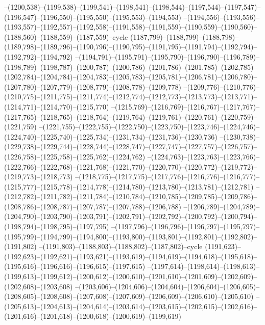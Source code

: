 --(1200,538)--(1199,538)--(1199,541)--(1198,541)--(1198,544)--(1197,544)--(1197,547)--(1196,547)--(1196,550)--(1195,550)--(1195,553)--(1194,553)
--(1194,556)--(1193,556)--(1193,557)--(1192,557)--(1192,558)--(1191,558)--(1191,559)--(1190,559)--(1190,560)--(1188,560)--(1188,559)--(1187,559)--cycle
(1187,799)--(1188,799)--(1188,798)--(1189,798)--(1189,796)--(1190,796)--(1190,795)--(1191,795)--(1191,794)--(1192,794)--(1192,792)--(1194,792)
--(1194,791)--(1195,791)--(1195,790)--(1196,790)--(1196,789)--(1198,789)--(1198,787)--(1200,787)--(1200,786)--(1201,786)--(1201,785)--(1202,785)
--(1202,784)--(1204,784)--(1204,783)--(1205,783)--(1205,781)--(1206,781)--(1206,780)--(1207,780)--(1207,779)--(1208,779)--(1208,778)--(1209,778)
--(1209,776)--(1210,776)--(1210,775)--(1211,775)--(1211,774)--(1212,774)--(1212,773)--(1213,773)--(1213,771)--(1214,771)--(1214,770)--(1215,770)
--(1215,769)--(1216,769)--(1216,767)--(1217,767)--(1217,765)--(1218,765)--(1218,764)--(1219,764)--(1219,761)--(1220,761)--(1220,759)--(1221,759)
--(1221,755)--(1222,755)--(1222,750)--(1223,750)--(1223,746)--(1224,746)--(1224,740)--(1225,740)--(1225,734)--(1231,734)--(1231,736)--(1230,736)
--(1230,738)--(1229,738)--(1229,744)--(1228,744)--(1228,747)--(1227,747)--(1227,757)--(1226,757)--(1226,758)--(1225,758)--(1225,762)--(1224,762)
--(1224,763)--(1223,763)--(1223,766)--(1222,766)--(1222,768)--(1221,768)--(1221,770)--(1220,770)--(1220,772)--(1219,772)--(1219,773)--(1218,773)
--(1218,775)--(1217,775)--(1217,776)--(1216,776)--(1216,777)--(1215,777)--(1215,778)--(1214,778)--(1214,780)--(1213,780)--(1213,781)--(1212,781)
--(1212,782)--(1211,782)--(1211,784)--(1210,784)--(1210,785)--(1209,785)--(1209,786)--(1208,786)--(1208,787)--(1207,787)--(1207,788)--(1206,788)
--(1206,789)--(1204,789)--(1204,790)--(1203,790)--(1203,791)--(1202,791)--(1202,792)--(1200,792)--(1200,794)--(1198,794)--(1198,795)--(1197,795)
--(1197,796)--(1196,796)--(1196,797)--(1195,797)--(1195,799)--(1194,799)--(1194,800)--(1193,800)--(1193,801)--(1192,801)--(1192,802)--(1191,802)
--(1191,803)--(1188,803)--(1188,802)--(1187,802)--cycle
(1191,623)--(1192,623)--(1192,621)--(1193,621)--(1193,619)--(1194,619)--(1194,618)--(1195,618)--(1195,616)--(1196,616)--(1196,615)--(1197,615)
--(1197,614)--(1198,614)--(1198,613)--(1199,613)--(1199,612)--(1200,612)--(1200,610)--(1201,610)--(1201,609)--(1202,609)--(1202,608)--(1203,608)
--(1203,606)--(1204,606)--(1204,604)--(1206,604)--(1206,605)--(1208,605)--(1208,608)--(1207,608)--(1207,609)--(1206,609)--(1206,610)--(1205,610)
--(1205,613)--(1204,613)--(1204,614)--(1203,614)--(1203,615)--(1202,615)--(1202,616)--(1201,616)--(1201,618)--(1200,618)--(1200,619)--(1199,619)
